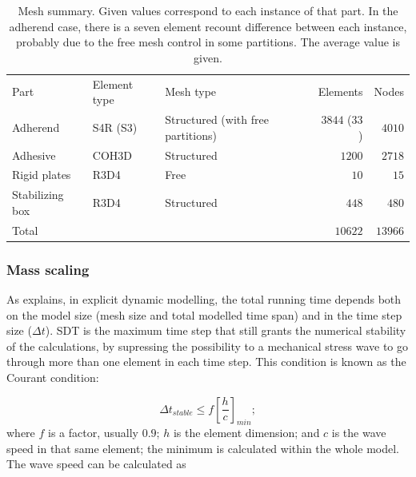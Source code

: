 \documentclass[cmfonts]{witpress}
\begin{document}
\begin{table}
	\centering
	\begin{tabular}{ll p{3cm} rr}

		

		Part & Element type & Mesh type & Elements & Nodes \\

		

		Adherend & S4R (S3) & Structured (with free partitions) & $3844$ ($33$) & $4010$ \\
		Adhesive & COH3D & Structured & $1200$ & $2718$ \\
		Rigid plates & R3D4 & Free & $10$ & $15$ \\
		Stabilizing box & R3D4 & Structured & $448$ & $480$ \\

		

		Total &&& $10622$ & $13966$ \\

		

	\end{tabular}
	\caption[Mesh summary.]{Mesh summary. Given values correspond to each instance of that part. In the adherend case, there is a seven element recount difference between each instance, probably due to the free mesh control in some partitions. The average value is given.}
	\label{tab:mesh}
\end{table}

\subsubsection{Mass scaling}
\label{sec:mass_scaling}

As \cite{Hale} explains, in explicit dynamic modelling, the total running time depends both on the model size (mesh size and total modelled time span) and in the time step size (${\Delta}t$). SDT is the maximum time step that still grants the numerical stability of the calculations, by supressing the possibility to a mechanical stress wave to go through more than one element in each time step. This condition is known as the Courant condition:

\begin{equation}
{\Delta}t_{stable} \leq f \left[\frac{h}{c}\right]_{min} ;
\label{eq:courant}
\end{equation}
where $f$ is a factor, usually $0.9$; $h$ is the element dimension; and $c$ is the wave speed in that same element; the minimum is calculated within the whole model. The wave speed can be calculated as
\end{document}
